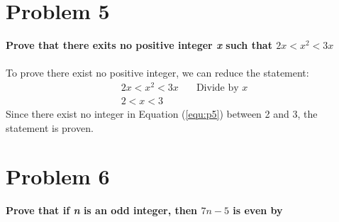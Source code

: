 \documentclass[english,10pt,a4paper]{article}
\begin{document}
\section*{Problem 5}
\textbf{Prove that there exits no positive integer \textit{x} such that $2x < x^2 < 3x$}
\\
\\
To prove there exist no positive integer, we can reduce the statement:
\begin{align}
2x < x^2 < 3x & \quad \text{Divide by } x\\
2 < x < 3 \label{equ:p5}
\end{align}
Since there exist no integer in Equation (\ref{equ:p5}) between 2 and 3, the statement is proven.



\section*{Problem 6}
\textbf{Prove that if \textit{n} is an odd integer, then $7n-5$ is even by}
\end{document}
